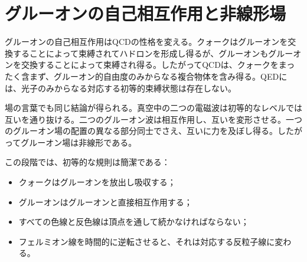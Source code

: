 \section{グルーオンの自己相互作用と非線形場}

グルーオンの自己相互作用はQCDの性格を変える。クォークはグルーオンを交換することによって束縛されてハドロンを形成し得るが、グルーオンもグルーオンを交換することによって束縛され得る。したがってQCDは、クォークをまったく含まず、グルーオン的自由度のみからなる複合物体を含み得る。QEDには、光子のみからなる対応する初等的束縛状態は存在しない。

場の言葉でも同じ結論が得られる。真空中の二つの電磁波は初等的なレベルでは互いを通り抜ける。二つのグルーオン波は相互作用し、互いを変形させる。一つのグルーオン場の配置の異なる部分同士でさえ、互いに力を及ぼし得る。したがってグルーオン場は非線形である。

\begin{classroomqa}
\end{classroomqa}

\begin{classroomqa}
\end{classroomqa}

\begin{classroomqa}
\end{classroomqa}

この段階では、初等的な規則は簡潔である：

\begin{itemize}
\item クォークはグルーオンを放出し吸収する；
\item グルーオンはグルーオンと直接相互作用する；
\item すべての色線と反色線は頂点を通して続かなければならない；
\item フェルミオン線を時間的に逆転させると、それは対応する反粒子線に変わる。
\end{itemize}


